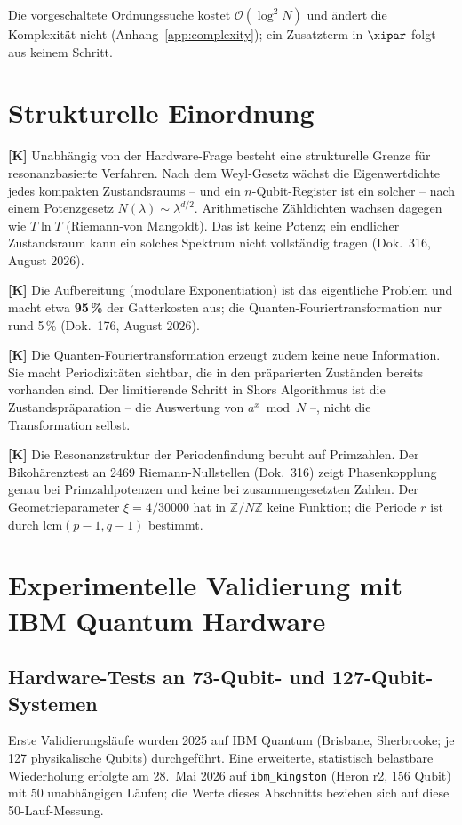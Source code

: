 Die vorgeschaltete Ordnungssuche kostet $\mathcal{O}(\log^2 N)$ und ändert die Komplexität nicht (Anhang~\ref{app:complexity}); ein Zusatzterm in $\xipar$ folgt aus keinem Schritt.

\section{Strukturelle Einordnung}

\textbf{[K]} Unabhängig von der Hardware-Frage besteht eine strukturelle Grenze
für resonanzbasierte Verfahren. Nach dem Weyl-Gesetz wächst die
Eigenwertdichte jedes kompakten Zustandsraums -- und ein $n$-Qubit-Register
ist ein solcher -- nach einem Potenzgesetz $N(\lambda) \sim \lambda^{d/2}$.
Arithmetische Zähldichten wachsen dagegen wie $T \ln T$ (Riemann-von
Mangoldt). Das ist keine Potenz; ein endlicher Zustandsraum kann ein solches
Spektrum nicht vollständig tragen (Dok.~316, August 2026).

\textbf{[K]} Die Aufbereitung (modulare Exponentiation) ist das eigentliche
Problem und macht etwa \textbf{95\,\%} der Gatterkosten aus;
die Quanten-Fouriertransformation nur rund 5\,\% (Dok.~176, August 2026).

\textbf{[K]} Die Quanten-Fouriertransformation erzeugt zudem keine neue
Information. Sie macht Periodizitäten sichtbar, die in den präparierten
Zuständen bereits vorhanden sind. Der limitierende Schritt in Shors Algorithmus
ist die Zustandspräparation -- die Auswertung von $a^x \bmod N$ --, nicht die
Transformation selbst.

\textbf{[K]} Die Resonanzstruktur der Periodenfindung beruht auf Primzahlen.
Der Bikohärenztest an 2469 Riemann-Nullstellen (Dok.~316) zeigt Phasenkopplung
genau bei Primzahlpotenzen und keine bei zusammengesetzten Zahlen. Der
Geometrieparameter $\xi = 4/30000$ hat in $\mathbb{Z}/N\mathbb{Z}$ keine
Funktion; die Periode $r$ ist durch $\mathrm{lcm}(p-1,q-1)$ bestimmt.

\section{Experimentelle Validierung mit IBM Quantum Hardware}
\label{sec:ibm_validation}

\subsection{Hardware-Tests an 73-Qubit- und 127-Qubit-Systemen}

Erste Validierungsläufe wurden 2025 auf IBM Quantum (Brisbane, Sherbrooke; je 127 physikalische Qubits) durchgeführt. Eine erweiterte, statistisch belastbare Wiederholung erfolgte am 28.~Mai 2026 auf \texttt{ibm\_kingston} (Heron r2, 156 Qubit) mit 50 unabhängigen Läufen; die Werte dieses Abschnitts beziehen sich auf diese 50-Lauf-Messung.

